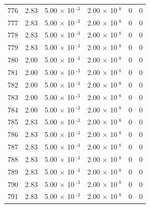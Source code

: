 \documentclass[a4paper,11pt]{article}
\begin{document}
\begin{center}
\begin{longtable}{|R{1.5cm}|R{2.4cm}|R{2.4cm}|R{2.4cm}|R{2.4cm}|R{2.4cm}|}
  776 &   2.83  &         5.00 $\times$ 10$^{\text{          -3}}$  &         2.00 $\times$ 10$^{\text{           8}}$  & 0  & 0 \\
  777 &   2.83  &         5.00 $\times$ 10$^{\text{          -3}}$  &         2.00 $\times$ 10$^{\text{           8}}$  & 0  & 0 \\
  778 &   2.83  &         5.00 $\times$ 10$^{\text{          -3}}$  &         2.00 $\times$ 10$^{\text{           8}}$  & 0  & 0 \\
  779 &   2.83  &         5.00 $\times$ 10$^{\text{          -3}}$  &         2.00 $\times$ 10$^{\text{           8}}$  & 0  & 0 \\
  780 &   2.00  &         5.00 $\times$ 10$^{\text{          -3}}$  &         2.00 $\times$ 10$^{\text{           8}}$  & 0  & 0 \\
  781 &   2.00  &         5.00 $\times$ 10$^{\text{          -3}}$  &         2.00 $\times$ 10$^{\text{           8}}$  & 0  & 0 \\
  782 &   2.00  &         5.00 $\times$ 10$^{\text{          -3}}$  &         2.00 $\times$ 10$^{\text{           8}}$  & 0  & 0 \\
  783 &   2.00  &         5.00 $\times$ 10$^{\text{          -3}}$  &         2.00 $\times$ 10$^{\text{           8}}$  & 0  & 0 \\
  784 &   2.00  &         5.00 $\times$ 10$^{\text{          -3}}$  &         2.00 $\times$ 10$^{\text{           8}}$  & 0  & 0 \\
  785 &   2.83  &         5.00 $\times$ 10$^{\text{          -3}}$  &         2.00 $\times$ 10$^{\text{           8}}$  & 0  & 0 \\
  786 &   2.83  &         5.00 $\times$ 10$^{\text{          -3}}$  &         2.00 $\times$ 10$^{\text{           8}}$  & 0  & 0 \\
  787 &   2.83  &         5.00 $\times$ 10$^{\text{          -3}}$  &         2.00 $\times$ 10$^{\text{           8}}$  & 0  & 0 \\
  788 &   2.83  &         5.00 $\times$ 10$^{\text{          -3}}$  &         2.00 $\times$ 10$^{\text{           8}}$  & 0  & 0 \\
  789 &   2.83  &         5.00 $\times$ 10$^{\text{          -3}}$  &         2.00 $\times$ 10$^{\text{           8}}$  & 0  & 0 \\
  790 &   2.83  &         5.00 $\times$ 10$^{\text{          -3}}$  &         2.00 $\times$ 10$^{\text{           8}}$  & 0  & 0 \\
  791 &   2.83  &         5.00 $\times$ 10$^{\text{          -3}}$  &         2.00 $\times$ 10$^{\text{           8}}$  & 0  & 0 \\

\end{longtable}
\end{center}
\end{document}

